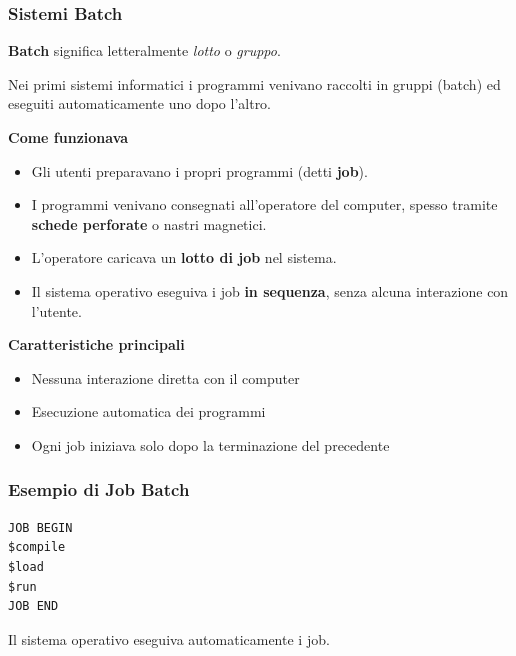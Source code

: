 \documentclass{beamer}
\begin{document}
\begin{frame}
	\frametitle{Sistemi Batch}
	
	\textbf{Batch} significa letteralmente \textit{lotto} o \textit{gruppo}.
	
	Nei primi sistemi informatici i programmi venivano raccolti
	in gruppi (batch) ed eseguiti automaticamente uno dopo l'altro.
	
	
	\textbf{Come funzionava}
	
	\begin{itemize}
		
		\item Gli utenti preparavano i propri programmi (detti \textbf{job}).
		
		\item I programmi venivano consegnati all'operatore del computer,
		spesso tramite \textbf{schede perforate} o nastri magnetici.
		
		\item L'operatore caricava un \textbf{lotto di job} nel sistema.
		
		\item Il sistema operativo eseguiva i job \textbf{in sequenza},
		senza alcuna interazione con l'utente.
		
	\end{itemize}
	
	\textbf{Caratteristiche principali}
	
	\begin{itemize}
		
		\item Nessuna interazione diretta con il computer
		\item Esecuzione automatica dei programmi
		\item Ogni job iniziava solo dopo la terminazione del precedente
		
	\end{itemize}
	
\end{frame}
	
	
	\begin{frame}[fragile]
		\frametitle{Esempio di Job Batch}
		
		\begin{verbatim}
JOB BEGIN
$compile
$load
$run
JOB END
\end{verbatim}
		
		Il sistema operativo eseguiva automaticamente i job.
		
	\end{frame}
	
\end{document}
